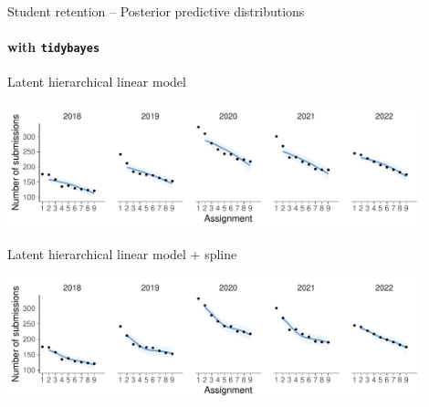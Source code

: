 \documentclass[english,t]{beamer}
\begin{document}
\begin{frame}[fragile]{Student retention -- Posterior predictive distributions}
\framesubtitle{with \texttt{tidybayes}}
  
\vspace{-0.75\baselineskip}  
Latent hierarchical linear model\\  
  \hspace{-7mm}
  \begin{minipage}[t][3.6cm][t]{1.0\linewidth}
    \includegraphics[height=3.6cm]{student_retention_lbinom_preds.pdf}
  \end{minipage}
  
\vspace{-0.25\baselineskip}  
Latent hierarchical linear model + spline\\  
  \hspace{-7mm}
  \begin{minipage}[t][3.6cm][t]{1.0\linewidth}
  \includegraphics[height=3.6cm]{student_retention_sbinom_preds.pdf}
  \end{minipage}  

\end{frame}
\end{document}
